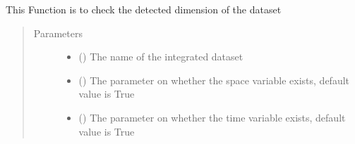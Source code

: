\documentclass[letterpaper,10pt,english]{sphinxmanual}
\begin{document}
\begin{fulllineitems}
\begin{fulllineitems}
\label{\detokenize{AgentTools.GenericModelAgent:AgentTools.GenericModelAgent.ForcingDataFileGenerator.ForcingDataFileGenerator.check_dimensions}}
This Function is to check the detected dimension of the dataset
\begin{quote}\begin{description}
\item[{Parameters}] \leavevmode\begin{itemize}
\item {} 
 () \textendash{} The name of the integrated dataset

\item {} 
 () \textendash{} The parameter on whether the space variable exists, default value is True

\item {} 
 () \textendash{} The parameter on whether the time variable exists, default value is True

\end{itemize}

\end{description}\end{quote}

\end{fulllineitems}



\end{fulllineitems}
\end{document}
